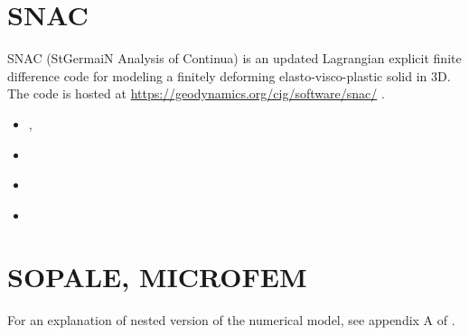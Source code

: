 \section{SNAC} 
SNAC (StGermaiN Analysis of Continua) is an updated Lagrangian explicit finite 
difference code for modeling a finitely deforming elasto-visco-plastic solid in 3D.
The code is hosted at \url{https://geodynamics.org/cig/software/snac/} .

\begin{small}
\begin{itemize}
\item[2008] \textcite{chlg08}, \textcite{chgu08}
\item[2010] \textcite{qula10}
\item[2011] \textcite{chss11}
\item[2012] \textcite{chbu12}
\end{itemize}
\end{small}

\section{SOPALE, MICROFEM}
For an explanation of nested version of the numerical model, see appendix A of \textcite{webe18}.


